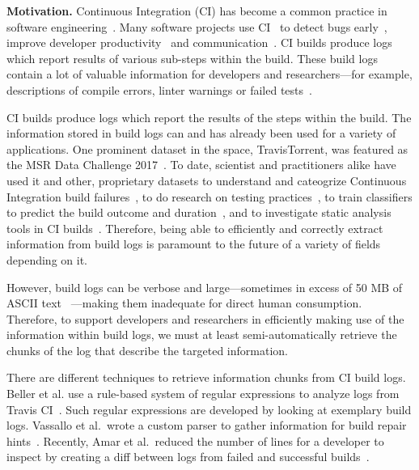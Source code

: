 

\textbf{Motivation.}
Continuous Integration (CI) has become a common practice in software
engineering~\cite{hilton2016usage}.  Many software projects use
CI~\cite{hilton2016usage,staahl2014modeling,beller2017oops} to detect
bugs early~\cite{vasilescu2015quality,duvall2007continuous}, improve
developer productivity~\cite{miller2008hundred,hilton2016usage} and
communication~\cite{downs2012ambient}.  CI builds produce logs which
report results of various sub-steps within the build.  These build logs
contain a lot of valuable information for developers and researchers---for
example, descriptions of compile errors, linter warnings or failed
tests~\cite{beller2017oops,seo2014programmers,vassallo2017a-tale}.

CI builds produce logs which report the results of the steps within the build. The information stored in build logs can and has
already been used for a variety of applications. One prominent dataset
in the space, TravisTorrent, was featured as the MSR Data Challenge
2017~\cite{msr17challenge}. To date, scientist and practitioners alike
have used it and other, proprietary datasets to understand and
cateogrize Continuous Integration build
failures~\cite{islam2017insights}, to do research on testing
practices~\cite{orellana2017differences}, to train classifiers to
predict the build outcome and
duration~\cite{ni2017cost,bisong2017built,machalica2019predictive},
and to investigate static analysis tools in CI
builds~\cite{zampetti2017open}. Therefore, being able to efficiently
and correctly extract information from build logs is paramount to the
future of a variety of fields depending on it.

However, build logs can be verbose and large---sometimes in excess of
50 MB of ASCII text ~\cite{beller2017oops}---making them inadequate
for direct human consumption. Therefore, to support developers and
researchers in efficiently making use of the information within build
logs, we must at least semi-automatically retrieve the chunks of the
log that describe the targeted information.

There are different techniques to retrieve information chunks from CI
build logs. Beller et al. use a rule-based system of regular
expressions to analyze logs from Travis CI~\cite{beller2017oops}.
Such regular expressions are developed by looking at exemplary build
logs.  Vassallo et al.\ wrote a custom parser to gather information
for build repair hints~\cite{vassallo2018un-break}.  Recently, Amar et
al.\ reduced the number of lines for a developer to inspect by
creating a diff between logs from failed and successful
builds~\cite{amar2019mining}.

